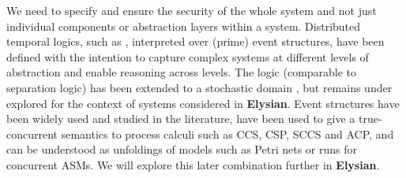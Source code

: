 \documentclass[a4paper,11pt]{article}
\newcommand{\project}[1]{\textbf{#1}\xspace}
\newcommand{\SECURITY}{\project{Elysian}}
\newcommand{\TheProject}{\SECURITY}
\begin{document}
We need  to specify and ensure the security of the whole system and not just individual components or abstraction layers within a system. Distributed temporal logics, such as {} \cite{Kue-TCS2006}, 
interpreted over (prime) event structures, have been defined with the intention to capture complex systems at different levels of abstraction and enable reasoning across levels. The logic (comparable to separation logic) has been extended to a stochastic domain \cite{BowVia14}, but remains 
under explored for the context of systems considered in \TheProject{}. 
Event structures have been widely used and studied in the literature, have been used to give a true-concurrent semantics to process calculi such as CCS, CSP, SCCS and ACP, and can be understood as unfoldings of models such as Petri nets or runs for concurrent ASMs. We will explore this later combination further in \TheProject{}.


\end{document}

